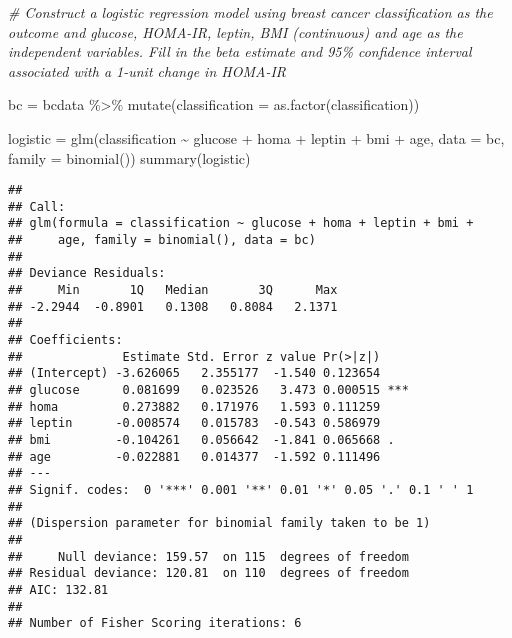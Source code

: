 \documentclass[
]{article}
\newenvironment{Shaded}{\begin{snugshade}}{\end{snugshade}}
\newcommand{\AttributeTok}[1]{\textcolor[rgb]{0.77,0.63,0.00}{#1}}
\newcommand{\CommentTok}[1]{\textcolor[rgb]{0.56,0.35,0.01}{\textit{#1}}}
\newcommand{\FunctionTok}[1]{\textcolor[rgb]{0.00,0.00,0.00}{#1}}
\newcommand{\NormalTok}[1]{#1}
\newcommand{\OtherTok}[1]{\textcolor[rgb]{0.56,0.35,0.01}{#1}}
\newcommand{\SpecialCharTok}[1]{\textcolor[rgb]{0.00,0.00,0.00}{#1}}
\begin{document}
\begin{Shaded}
\begin{Highlighting}[]
\CommentTok{\# Construct a logistic regression model using breast cancer classification as the outcome and glucose, HOMA{-}IR, leptin, BMI (continuous) and age as the independent variables. Fill in the beta estimate and 95\% confidence interval associated with a 1{-}unit change in HOMA{-}IR}

\NormalTok{bc }\OtherTok{=}\NormalTok{ bcdata }\SpecialCharTok{\%\textgreater{}\%} 
\FunctionTok{mutate}\NormalTok{(}\AttributeTok{classification =} \FunctionTok{as.factor}\NormalTok{(classification)) }

\NormalTok{logistic }\OtherTok{=} \FunctionTok{glm}\NormalTok{(classification }\SpecialCharTok{\textasciitilde{}}\NormalTok{ glucose }\SpecialCharTok{+}\NormalTok{ homa }\SpecialCharTok{+}\NormalTok{ leptin }\SpecialCharTok{+}\NormalTok{ bmi }\SpecialCharTok{+}\NormalTok{ age, }\AttributeTok{data =}\NormalTok{ bc, }\AttributeTok{family =} \FunctionTok{binomial}\NormalTok{()) }
\FunctionTok{summary}\NormalTok{(logistic)}
\end{Highlighting}
\end{Shaded}

\begin{verbatim}
## 
## Call:
## glm(formula = classification ~ glucose + homa + leptin + bmi + 
##     age, family = binomial(), data = bc)
## 
## Deviance Residuals: 
##     Min       1Q   Median       3Q      Max  
## -2.2944  -0.8901   0.1308   0.8084   2.1371  
## 
## Coefficients:
##              Estimate Std. Error z value Pr(>|z|)    
## (Intercept) -3.626065   2.355177  -1.540 0.123654    
## glucose      0.081699   0.023526   3.473 0.000515 ***
## homa         0.273882   0.171976   1.593 0.111259    
## leptin      -0.008574   0.015783  -0.543 0.586979    
## bmi         -0.104261   0.056642  -1.841 0.065668 .  
## age         -0.022881   0.014377  -1.592 0.111496    
## ---
## Signif. codes:  0 '***' 0.001 '**' 0.01 '*' 0.05 '.' 0.1 ' ' 1
## 
## (Dispersion parameter for binomial family taken to be 1)
## 
##     Null deviance: 159.57  on 115  degrees of freedom
## Residual deviance: 120.81  on 110  degrees of freedom
## AIC: 132.81
## 
## Number of Fisher Scoring iterations: 6
\end{verbatim}
\end{document}
